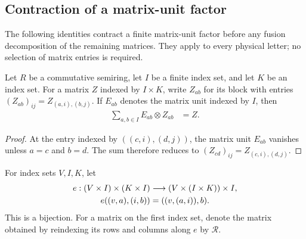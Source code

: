 \subsection{Contraction of a matrix-unit factor}

The following identities contract a finite matrix-unit factor before any
fusion decomposition of the remaining matrices. They apply to every
physical letter; no selection of matrix entries is required.

\begin{lemma}
    \label{thm:asymex_matrix_unit_register_reconstruction}
    \leanok
    Let $R$ be a commutative semiring, let $I$ be a finite index set,
    and let $K$ be an index set. For a matrix $Z$ indexed by
    $I\times K$, write $Z_{ab}$ for its block with entries
    ${(Z_{ab})}_{ij}=Z_{(a,i),(b,j)}$. If $E_{ab}$ denotes the matrix
    unit indexed by $I$, then
    \begin{align}
        \sum_{a,b\in I}E_{ab}\otimes Z_{ab} & =Z.
        \label{eq:asymex_matrix_unit_register_reconstruction}
    \end{align}
\end{lemma}

\begin{proof}\leanok
    At the entry indexed by $((c,i),(d,j))$, the matrix unit
    $E_{ab}$ vanishes unless $a=c$ and $b=d$. The sum therefore
    reduces to ${(Z_{cd})}_{ij}=Z_{(c,i),(d,j)}$.
\end{proof}

\begin{definition}
    \label{def:asymex_matrix_unit_register_reassociation}
    \leanok
    For index sets $V,I,K$, let
    \begin{align}
        e:(V\times I)\times(K\times I)
                       & \longrightarrow (V\times(I\times K))\times I, \notag \\
        e((v,a),(i,b)) & =((v,(a,i)),b).
        \label{eq:asymex_matrix_unit_register_reassociation}
    \end{align}
    This is a bijection. For a matrix on the first index set, denote
    the matrix obtained by reindexing its rows and columns along $e$ by $\mathcal R$.
\end{definition}


